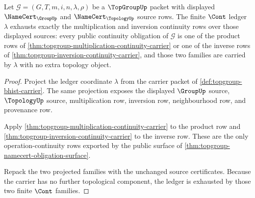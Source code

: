 \begin{theorem}
\label{thm:topgroup-cont-ledger-continuity-exhaustion}
Let $\mathcal G=(G,T,m,i,n,\lambda,\rho)$ be a $\TopGroupUp$ packet with
displayed $\NameCert_{\GroupUp}$ and $\NameCert_{\TopologyUp}$ source rows.
The finite $\Cont$ ledger $\lambda$ exhausts exactly the multiplication and
inversion continuity rows over those displayed sources: every public
continuity obligation of $\mathcal G$ is one of the product rows of
\autoref{thm:topgroup-multiplication-continuity-carrier} or one of the
inverse rows of \autoref{thm:topgroup-inversion-continuity-carrier}, and
those two families are carried by $\lambda$ with no extra topology object.
\end{theorem}
\begin{proof}
Project the ledger coordinate $\lambda$ from the carrier packet of
\autoref{def:topgroup-bhist-carrier}. The same projection exposes the
displayed $\GroupUp$ source, $\TopologyUp$ source, multiplication row,
inversion row, neighbourhood row, and provenance row.

Apply \autoref{thm:topgroup-multiplication-continuity-carrier} to the product
row and \autoref{thm:topgroup-inversion-continuity-carrier} to the inverse
row. These are the only operation-continuity rows exported by the public
surface of \autoref{thm:topgroup-namecert-obligation-surface}.

Repack the two projected families with the unchanged source certificates.
Because the carrier has no further topological component, the ledger is
exhausted by those two finite $\Cont$ families.
\end{proof}

